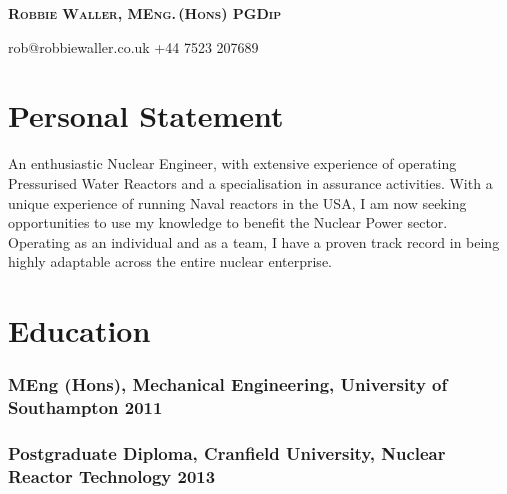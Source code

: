 \documentclass[a4paper, oneside, final, 11pt]{scrartcl} %
\begin{document}


{\fontsize{21}{21}\bfseries\scshape{Robbie Waller, MEng.\,(Hons) PGDip}} %

\bigskip

\faEnvelopeO \space rob@robbiewaller.co.uk \hfill  \faMobile \space +44 7523 207689

\medskip

\section{Personal Statement}

An enthusiastic Nuclear Engineer, with extensive experience of operating Pressurised Water Reactors and a specialisation in assurance activities. With a unique experience of running Naval reactors in the USA, I am now seeking opportunities to use my knowledge to benefit the Nuclear Power sector. Operating as an individual and as a team, I have a proven track record in being highly adaptable across the entire nuclear enterprise.


\section{Education}

\subsubsection*{MEng (Hons), Mechanical Engineering, University of Southampton \hfill 2011}  

\bigskip

\subsubsection*{Postgraduate Diploma, Cranfield University, Nuclear Reactor Technology \hfill 2013}  
\end{document}
